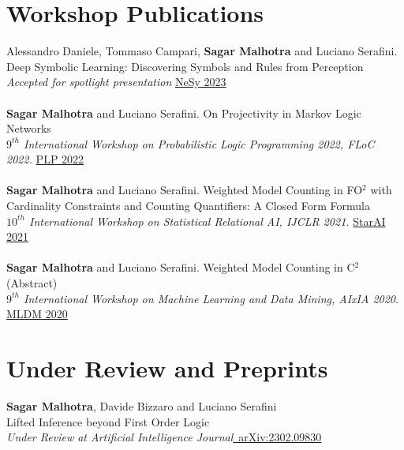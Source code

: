 \documentclass[10pt, a4paper]{article}
\newcommand{\years}[1]{\marginnote{\scriptsize #1}}
\begin{document}
\section*{Workshop Publications}
\noindent
\years{2023} Alessandro Daniele, Tommaso Campari, \textbf{Sagar Malhotra} and Luciano Serafini. \\ Deep Symbolic Learning: Discovering Symbols and Rules from Perception \\ \emph{Accepted for spotlight presentation} \href{https://sites.google.com/view/nesy2023/home/nesy2023-programme-outline?authuser=0}{NeSy 2023}\\ \\
\years{2022}\textbf{Sagar Malhotra} and Luciano Serafini. On Projectivity in Markov Logic Networks\\ 
\emph{$9^{th}$ International Workshop on Probabilistic Logic Programming 2022, FLoC 2022.} \href{https://easychair.org/publications/preprint/2lTk}{ PLP 2022}\\ \\
\years{2021}\textbf{Sagar Malhotra} and Luciano Serafini. Weighted Model Counting in FO$^2$ with Cardinality Constraints and Counting Quantifiers: A Closed Form Formula\\ \emph{$10^{th}$ International Workshop on Statistical Relational AI, IJCLR 2021. }\href{https://starai.cs.kuleuven.be/2021/}{ StarAI 2021} \\ \\ 
\years{{2020}}\textbf{Sagar Malhotra} and Luciano Serafini. Weighted Model Counting in C$^2$ (Abstract) \\
\emph{$9^{th}$ International Workshop on Machine Learning and Data Mining, AIxIA 2020}. \href{https://sites.google.com/view/mldm2020-workshop/program?authuser=0}{MLDM 2020}

\section*{Under Review and Preprints}
\years{2023}\textbf{Sagar Malhotra}, Davide Bizzaro and Luciano Serafini\\
Lifted Inference beyond First Order Logic\\
\emph{Under Review at Artificial Intelligence Journal}\href{https://arxiv.org/abs/2302.09830}{\  arXiv:2302.09830}\\ 
\end{document}
